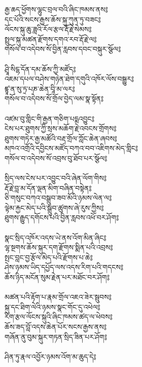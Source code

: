 རྒྱ་ཆད་ཕྱོགས་ལྷུང་བྲལ་བའི་ཞིང་ཁམས་ནས༔\\
དང་པོའི་སངས་རྒྱས་ཆོས་སྐུ་ཀུན་ཏུ་བཟང༔\\
ལོངས་སྐུ་ཆུ་ཟླའི་རོལ་རྩལ་རྡོ་རྗེ་སེམས༔\\
སྤྲུལ་སྐུ་མཚན་རྫོགས་དགའ་རབ་རྡོ་རྗེ་ལ༔\\
གསོལ་བ་འདེབས་སོ་བྱིན་རླབས་དབང་བསྐུར་སྩོལ༔\\
\\
ཤྲཱི་སིངྷ་དོན་དམ་ཆོས་ཀྱི་མཛོད༔\\
འཇམ་དཔལ་བཤེས་གཉེན་ཐེག་དགུའི་འཁོར་ལོས་བསྒྱུར༔\\
ཛྙཱ་ན་སུ་ཏྲ་པཎ་ཆེན་བཱི་མ་ལར༔\\
གསོལ་བ་འདེབས་སོ་གྲོལ་བྱེད་ལམ་སྣ་སྟོན༔\\
\\
འཛམ་བུ་གླིང་གི་རྒྱན་གཅིག་པདྨའབྱུང༔\\
ངེས་པར་ཐུགས་ཀྱི་སྲས་མཆོག་རྗེ་འབངས་གྲོགས༔\\
ཐུགས་གཏེར་རྒྱ་མཚོའི་བརྡ་གྲོལ་ཀློང་ཆེན་ཞབས༔\\
མཁའ་འགྲོའི་དབྱིངས་མཛོད་བཀའ་བབ་འཇིགས་མེད་གླིང༔\\
གསོལ་བ་འདེབས་སོ་འབྲས་བུ་ཐོབ་པར་སྩོལ༔\\
\\
སྲིད་ལས་ངེས་པར་འབྱུང་བའི་ཞེན་ལོག་གིས༔\\
རྡོ་རྗེ་བླ་མ་དོན་ལྡན་མིག་བཞིན་བསྟེན༔\\
ཅི་གསུང་བཀའ་བསྒྲུབ་ཟབ་མོའི་ཉམས་ལེན་ལ༔\\
ལྟེམ་རྐྱང་མེད་པའི་སྒྲུབ་ཚུགས་ཞེ་རུས་ཀྱིས༔\\
ཐུགས་རྒྱུད་དགོངས་པའི་བྱིན་རླབས་འཕོ་བར་ཤོག༔\\
\\
སྣང་སྲིད་འཁོར་འདས་ཡེ་ནས་འོག་མིན་ཞིང༔\\
ལྷ་སྔགས་ཆོས་སྐུར་དག་རྫོགས་སྨིན་པའི་འབྲས༔\\
སྤང་བླང་བྱ་རྩོལ་མེད་པའི་རྫོགས་པ་ཆེ༔\\
ཤེས་ཉམས་ཡིད་དཔྱོད་ལས་འདས་རིག་པའི་གདངས༔\\
ཆོས་ཉིད་མངོན་སུམ་རྗེན་པར་མཐོང་བར་ཤོག༔\\
\\
མཚན་པའི་རྟོག་པ་རྣམ་གྲོལ་འཇའ་ཟེར་སྦུབས༔\\
སྐུ་དང་ཐིག་ལེའི་ཉམས་སྣང་གོང་དུ་འཕེལ༔\\
རིག་རྩལ་ལོངས་སྐུའི་ཞིང་ཁམས་ཚད་ལ་ཕེབས༔\\
ཆོས་ཟད་བློ་འདས་ཆེན་པོར་སངས་རྒྱས་ནས༔\\
གཞོན་ནུ་བུམ་སྐུར་གཏན་སྲིད་ཟིན་པར་ཤོག༔\\
\\
ཤིན་ཏུ་རྣལ་འབྱོར་ཉམས་འོག་མ་ཆུད་དེ༔\\
